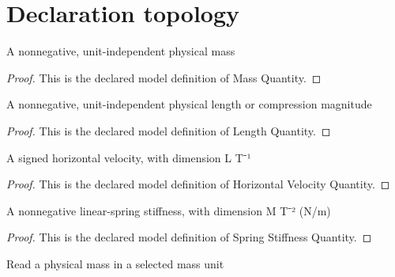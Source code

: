 \section{Declaration topology}
\begin{definition}
  \label{def:physics:phyx-mini-0763:phyxminiproblems-problemphyxmini0763-massquantity}
  A nonnegative, unit-independent physical mass
\end{definition}
\begin{proof}
  This is the declared model definition of Mass Quantity.
\end{proof}
\begin{definition}
  \label{def:physics:phyx-mini-0763:phyxminiproblems-problemphyxmini0763-lengthquantity}
  A nonnegative, unit-independent physical length or compression magnitude
\end{definition}
\begin{proof}
  This is the declared model definition of Length Quantity.
\end{proof}
\begin{definition}
  \label{def:physics:phyx-mini-0763:phyxminiproblems-problemphyxmini0763-horizontalvelocityquantity}
  A signed horizontal velocity, with dimension L T⁻¹
\end{definition}
\begin{proof}
  This is the declared model definition of Horizontal Velocity Quantity.
\end{proof}
\begin{definition}
  \label{def:physics:phyx-mini-0763:phyxminiproblems-problemphyxmini0763-springstiffnessquantity}
  A nonnegative linear-spring stiffness, with dimension M T⁻² (N/m)
\end{definition}
\begin{proof}
  This is the declared model definition of Spring Stiffness Quantity.
\end{proof}
\begin{definition}
  \label{def:physics:phyx-mini-0763:phyxminiproblems-problemphyxmini0763-massreadout}
  Read a physical mass in a selected mass unit
\end{definition}
